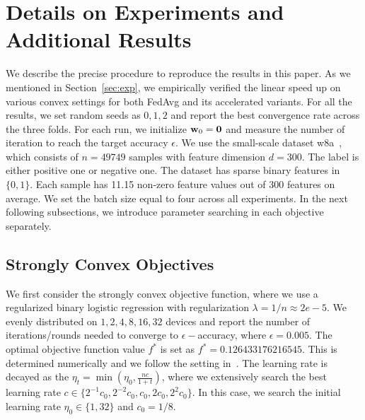 
\section{Details on Experiments and Additional Results}
\label{sec:expsupp}

We describe the precise procedure to reproduce the results in this paper.
As we mentioned in Section~\ref{sec:exp}, we empirically verified the
linear speed up on various convex settings for both FedAvg and its
accelerated variants. For all the results, we set random seeds as $0, 1, 2$
and report the best convergence rate across the three folds. For each
run, we initialize ${\mathbf{w}}_0 = \mathbf{0}$ and measure the number of iteration
to reach the target accuracy $\epsilon$. We use the small-scale dataset
w8a~\cite{platt1998fast}, which consists of $n = 49749 $ samples with
feature dimension $d = 300$. The label is either positive one or negative one.
The dataset has sparse binary features in $\{0, 1\}$. Each sample
has 11.15 non-zero feature values out of $300$ features on average.
We set the batch size equal to four across all experiments.
In the next following subsections,
we introduce parameter searching in each objective separately.


\subsection{Strongly Convex Objectives}
We first consider the strongly convex objective function, where we use
a regularized binary logistic regression with regularization $\lambda=1/n\approx 2e-5$. We evenly distributed on $1, 2, 4, 8, 16, 32$ devices and  report the number of iterations/rounds needed to converge to $\epsilon-$accuracy, where $\epsilon=0.005$. The optimal objective function value $f^*$
is set as $f^* = 0.126433176216545$. This is determined numerically and we follow the setting in~\cite{stich2018local}. The learning rate is decayed as the $\eta_t = \min(\eta_0, \frac{nc}{1 + t})$, where we extensively search the best learning rate $c \in \{2^{-1}c_0, 2^{-2}c_0, c_0, 2c_0, 2^{2}c_0\}$. In this case, we search the initial learning rate $\eta_0\in \{1, 32\}$ and $c_0 = 1/8$.


